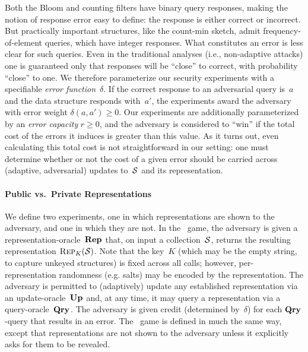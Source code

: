 Both the Bloom and counting filters have binary query responses,
making the notion of response error easy to define: the response is
either correct or incorrect.  But practically important structures, like the count-min sketch, admit
frequency-of-element queries, which have integer responses.  What
constitutes an error is less clear for such queries.
%
Even in the traditional analyses (i.e., non-adaptive attacks) one is
guaranteed only that responses will be ``close'' to correct,
with probability ``close'' to one. 
We therefore parameterize our security experiments with a specifiable
\emph{error function}~$\delta$.  If the correct response to an adversarial
query is~$a$ and the data structure responds with~$a'$, the
experiments award the adversary with error weight $\delta(a,a') \geq 0$.
%
Our experiments are additionally parameterized by an \emph{error capacity}
$r\geq0$, and the adversary is considered to ``win'' if the total cost of the
errors it induces is greater than this value.  As it turns out, even calculating
this total cost is not straightforward in our setting: one must determine whether
or not the cost of a given error should be carried across (adaptive,
adversarial) updates to~$\mathcal{S}$ and its representation.

\paragraph{Public vs.\ Private Representations}
We define two experiments, one in which representations are shown to
the adversary, and one in which they are not.
%
In the \errep\ game, the adversary is given a
representation-oracle~$\textup{\textbf{Rep}}\hspace{0.5pt}$ that, on input a collection~$\mathcal{S}$,
returns the resulting representation $\textnormal{\textsc{Rep}}_K(\mathcal{S})$. Note that the
key~$K$ (which may be the empty string, to capture unkeyed structures)
is fixed across all calls; however, per-representation randomness
(e.g. salts) may be encoded by the representation.  The adversary is permitted to
(adaptively) update any established representation via an
update-oracle~$\textup{\textbf{Up}}\hspace{0.5pt}$ and, at any time, it may query a representation
via a query-oracle~$\textup{\textbf{Qry}}\hspace{0.5pt}$. The adversary is given credit (determined
by~$\delta$) for each $\textup{\textbf{Qry}}\hspace{0.5pt}$-query that results in an error.
%
The \erreps\ game is defined in much the same way, except that representations
are not shown to the adversary unless it explicitly asks for them to be
revealed.


